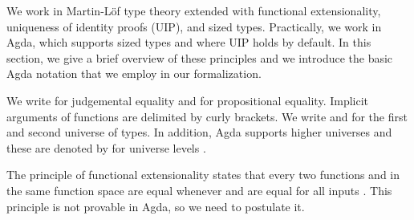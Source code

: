 
We work in Martin-L\"of type theory extended with functional
extensionality, uniqueness of identity proofs (UIP), and sized
types.  Practically, we work in Agda, which supports sized types and
where UIP holds by default. In this section, we give a brief
overview of these principles and we introduce the basic Agda notation
that we employ in our formalization.

We write \Ar{=} for judgemental equality and  for propositional
equality. Implicit arguments of functions are delimited by curly
brackets. We write  and  for the first and second
universe of types. In addition, Agda supports higher universes and
these are denoted by   for universe levels .

The principle of functional extensionality states that every two
functions  and  in the same function space are
 equal whenever  and  are equal for all
inputs . This principle is not provable in Agda, so we need to
postulate it.
\begin{code}%
\>[0]\<%
\\
\>[0][@{}l@{\AgdaIndent{0}}]%
\>[2]\AgdaSpace{}%
\AgdaSymbol{:}\AgdaSpace{}%
\AgdaSymbol{\{}\AgdaSpace{}%
\AgdaSymbol{:}\AgdaSpace{}%
\AgdaSymbol{\}}\AgdaSpace{}%
\AgdaSymbol{\{}\AgdaSpace{}%
\AgdaSymbol{:}\AgdaSpace{}%
\AgdaSpace{}%
\AgdaSpace{}%
\AgdaSymbol{\}}\AgdaSpace{}%
\AgdaSymbol{\{}\AgdaSpace{}%
\AgdaSpace{}%
\AgdaSymbol{:}\AgdaSpace{}%
\AgdaSymbol{(}\AgdaSpace{}%
\AgdaSymbol{:}\AgdaSpace{}%
\AgdaSymbol{)}\AgdaSpace{}%
\AgdaSpace{}%
\AgdaSpace{}%
\AgdaSymbol{\}}\AgdaSpace{}%
\AgdaSpace{}%
\AgdaSymbol{((}\AgdaSpace{}%
\AgdaSymbol{:}\AgdaSpace{}%
\AgdaSymbol{)}\AgdaSpace{}%
\AgdaSpace{}%
\AgdaSpace{}%
\AgdaSpace{}%
\AgdaSpace{}%
\AgdaSpace{}%
\AgdaSymbol{)}\AgdaSpace{}%
\AgdaSpace{}%
\AgdaSpace{}%
\AgdaSpace{}%
\<%
\end{code}

